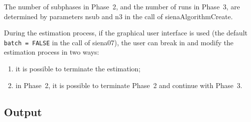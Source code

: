 \documentclass[a4paper,fleqn,11pt]{article}
\newcommand{\+}{\, + \,}
\begin{document}
The number of subphases in Phase~2, and the number of runs in
Phase~3, are determined by parameters \textsf{nsub} and \textsf{n3}
in the call of \textsf{sienaAlgorithmCreate}.

During the estimation process, if the graphical user interface
is used (the default \\
\texttt{batch = FALSE} in the call of \textsf{siena07}),
the user can break in and modify the estimation process in two
ways:
\begin{enumerate}
\item it is possible to terminate the estimation;
\item in Phase~2, it is possible to terminate Phase~2
      and continue with Phase~3.
\end{enumerate}



\subsection{Output}
\label{S_output}
\end{document}
